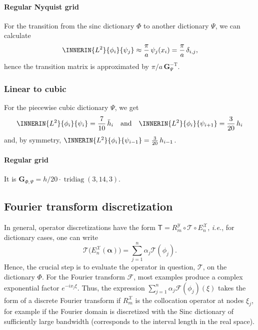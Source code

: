 \documentclass[a4paper]{paper}
\newcommand*{\SPC}[1]{{\ensuremath{\mathscr{#1}}}}
\newcommand*{\OP}[1]{{\ensuremath{\mathcal{#1}}}}
\newcommand*{\OPT}{\OP{T}}
\newcommand{\DISCOP}[1]{{\ensuremath{\mathsf{#1}}}}
\newcommand*{\EXT}[2]{\ensuremath{E_{#1}^{#2}}}
\newcommand*{\REST}[2]{\ensuremath{R_{#1}^{#2}}}
\newcommand*{\RmX}{{\ensuremath{\REST{m}{\SPC{X}}}}}
\newcommand*{\RmY}{{\ensuremath{\REST{m}{\SPC{Y}}}}}
\newcommand*{\EnX}{{\ensuremath{\EXT{n}{\SPC{X}}}}}
\newcommand*{\FT}{\OP{F}}
\DeclareMathOperator{\TRIDIAG}{{tridiag}}
\newcommand*{\I}{\ensuremath{\mathit{i}}}
\newcommand*{\ie}{\textsl{i.e.}\xspace}
\newcommand*{\BDalpha}{\boldsymbol{\alpha}}
\newcommand*{\BDG}{\boldsymbol{G}}
\begin{document}
\paragraph{Regular Nyquist grid}

For the transition from the sinc dictionary $\Phi$ to another dictionary $\Psi$, we can calculate
%
\begin{equation*}
 \INNERIN{L^2}{\phi_i}{\psi_j} \approx \frac{\pi}{a}\, \psi_j(x_i) = \frac{\pi}{a}\, \delta_{i,j},
\end{equation*}
%
hence the transition matrix is approximated by ${\pi}/{a}\, \BDG_\Psi^{-\mathrm{T}}$.



\subsubsection{Linear to cubic}
\label{subsubsec:specif:rediscr:lin2cub}

For the piecewise cubic dictionary $\Psi$, we get
%
\begin{equation*}
 \INNERIN{L^2}{\phi_i}{\psi_i} = \frac{7}{10}\, \bar h_i
 \quad \text{and} \quad
 \INNERIN{L^2}{\phi_i}{\psi_{i+1}} = \frac{3}{20}\, h_i
\end{equation*}
%
and, by symmetry, $\INNERIN{L^2}{\phi_i}{\psi_{i-1}} = \frac{3}{20}\, h_{i-1}$.

\paragraph{Regular grid}

It is $\BDG_{\Phi, \Psi} = h/20\cdot\TRIDIAG(3, 14, 3)$.


\subsection{Fourier transform discretization}
\label{subsec:specif:fourier}

In general, operator discretizations have the form $\DISCOP{T} = \RmY \circ \OPT \circ \EnX$, \ie, for dictionary 
cases, one can write
%
\begin{equation*}
 \OPT\big( \EnX(\BDalpha) \big) = \sum_{j=1}^n \alpha_j \OPT(\phi_j).
\end{equation*}
%
Hence, the crucial step is to evaluate the operator in question, $\OPT$, on the dictionary $\Phi$. For the Fourier 
transform $\FT$, most examples produce a complex exponential factor $e^{-\I x_j \xi}$. Thus, the expression 
$\sum_{j=1}^n \alpha_j \FT(\phi_j)(\xi)$ takes the form of a discrete Fourier transform if $\RmX$ is the collocation 
operator at nodes $\xi_j$, for example if the Fourier domain is discretized with the Sinc dictionary of sufficiently 
large bandwidth (corresponds to the interval length in the real space). 
\end{document}
